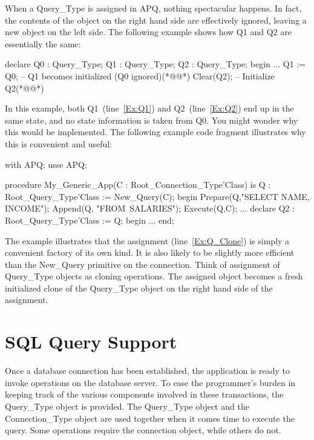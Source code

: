 \documentclass[english,letterpaper]{book}
\begin{document}
When a Query\_Type is assigned in APQ, nothing spectacular happens.
In fact, the contents of the object on the right hand side are effectively
ignored, leaving a new object on the left side. The following example
shows how Q1 and Q2 are essentially the same:

\begin{NumberedExample}
declare
   Q0 : Query_Type;
   Q1 : Query_Type;
   Q2 : Query_Type;
begin
   ...
   Q1 := Q0;   -- Q1 becomes initialized (Q0 ignored)(*@\label{Ex:Q1}@*)
   Clear(Q2);  -- Initialize Q2(*@\label{Ex:Q2}@*)
\end{NumberedExample}

In this example, both Q1~(line~\ref{Ex:Q1}) and Q2~(line~\ref{Ex:Q2})
end up in the same state, and no state information is taken from Q0. You
might wonder why this would be implemented. The following example code
fragment illustrates why this is convenient and useful:

\begin{NumberedExample}
with APQ;
usse APQ;

procedure My_Generic_App(C : Root_Connection_Type'Class) is
   Q : Root_Query_Type'Class := New_Query(C);
begin
   Prepare(Q,"SELECT NAME, INCOME");
   Append(Q, "FROM~SALARIES");
   Execute(Q,C);
   ...
   declare
      Q2 : Root_Query_Type'Class := Q;\label{Ex:Q_Clone}
   begin
      ...
   end;
\end{NumberedExample}

The example illustrates that the assignment (line~\ref{Ex:Q_Clone}) is
simply a convenient factory of its own kind. It is also likely to be
slightly more efficient than the New\_Query primitive on the
connection. Think of assignment of Query\_Type objects as cloning
operations. The assigned object becomes a fresh initialized clone of the
Query\_Type object on the right hand side of the assignment.

\chapter{SQL Query Support}

Once a database connection has been established, the application is
ready to invoke operations on the database server. To ease the programmer's
burden in keeping track of the various components involved in these
transactions, the Query\_Type object is provided. The Query\_Type
object and the Connection\_Type object are used together when it comes
time to execute the query. Some operations require the connection
object, while others do not.
\end{document}
